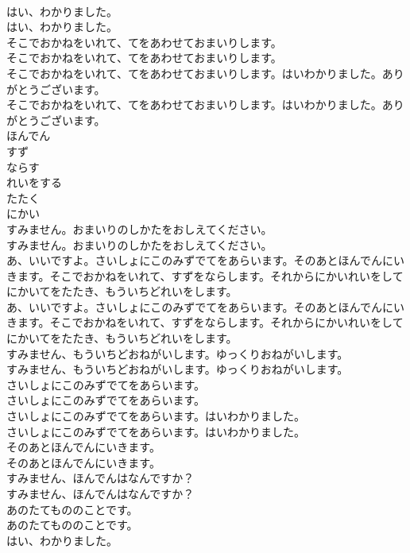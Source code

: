 \documentclass[8pt]{extreport}
\begin{document}
\begin{CJK}{UTF8}{min}
\\	はい、わかりました。	
\\	はい、わかりました。 
\\	そこでおかねをいれて、てをあわせておまいりします。	
\\	そこでおかねをいれて、てをあわせておまいりします。 
\\	そこでおかねをいれて、てをあわせておまいりします。はいわかりました。ありがとうございます。	
\\	そこでおかねをいれて、てをあわせておまいりします。はいわかりました。ありがとうございます。 
\\	ほんでん
\\	すず
\\	ならす
\\	れいをする
\\	たたく
\\	にかい
\\	すみません。おまいりのしかたをおしえてください。	
\\	すみません。おまいりのしかたをおしえてください。 
\\	あ、いいですよ。さいしょにこのみずでてをあらいます。そのあとほんでんにいきます。そこでおかねをいれて、すずをならします。それからにかいれいをしてにかいてをたたき、もういちどれいをします。	
\\	あ、いいですよ。さいしょにこのみずでてをあらいます。そのあとほんでんにいきます。そこでおかねをいれて、すずをならします。それからにかいれいをしてにかいてをたたき、もういちどれいをします。 
\\	すみません、もういちどおねがいします。ゆっくりおねがいします。	
\\	すみません、もういちどおねがいします。ゆっくりおねがいします。 
\\	さいしょにこのみずでてをあらいます。	
\\	さいしょにこのみずでてをあらいます。 
\\	さいしょにこのみずでてをあらいます。はいわかりました。	
\\	さいしょにこのみずでてをあらいます。はいわかりました。 
\\	そのあとほんでんにいきます。	
\\	そのあとほんでんにいきます。 
\\	すみません、ほんでんはなんですか？	
\\	すみません、ほんでんはなんですか？ 
\\	あのたてもののことです。	
\\	あのたてもののことです。 
\\	はい、わかりました。	

\end{CJK}
\end{document}
